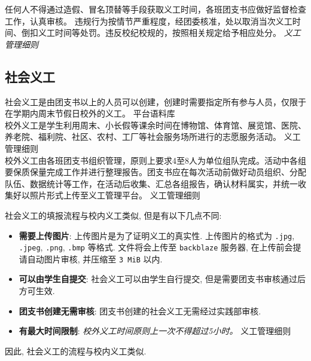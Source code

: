 \documentclass{article}
\begin{document}
\begin{mdframed}
  \fangsong
  任何人不得通过造假、冒名顶替等手段获取义工时间，各班团支书应做好监督检查工作，认真审核。
  违规行为按情节严重程度，经团委核准，处以取消当次义工时间、倒扣义工时间等处罚。违反校纪校规的，按照相关规定给予相应处分。
  \hfill \textit{义工管理细则}
\end{mdframed}

\subsection{社会义工}

\begin{mdframed}
  \fangsong
  社会义工是由团支书以上的人员可以创建，创建时需要指定所有参与人员，仅限于在学期内周末节假日校外的义工。 \hfill 平台语料库 \\
  校外义工是学生利用周末、小长假等课余时间在博物馆、体育馆、展览馆、医院、养老院、福利院、社区、农村、工厂等社会服务场所进行的志愿服务活动。 \hfill 义工管理细则 \\
  校外义工由各班团支书组织管理，原则上要求4至8人为单位组队完成。活动中各组要保质保量完成工作并进行整理报告。团支书应在每次活动前做好动员组织、分配队伍、数据统计等工作，在活动后收集、汇总各组报告，确认材料属实，并统一收集好以照片形式上传至义工管理平台。 \hfill 义工管理细则
\end{mdframed}

社会义工的填报流程与校内义工类似, 但是有以下几点不同:

\begin{itemize}
  \item \textbf{需要上传图片}: 上传图片是为了证明义工的真实性. 上传图片的格式为 \texttt{.jpg}, \texttt{.jpeg}, \texttt{.png}, \texttt{.bmp} 等格式. 文件将会上传至 \texttt{backblaze} 服务器, 在上传前会提请自动图片审核, 并压缩至 \texttt{3 MiB} 以内.
  \item \textbf{可以由学生自提交}: 社会义工可以由学生自行提交, 但是需要团支书审核通过后方可生效.
  \item \textbf{团支书创建无需审核}: 团支书创建的社会义工无需经过实践部审核.
  \item \textbf{有最大时间限制}: \textit{校外义工时间原则上一次不得超过5小时。} \hfill 义工管理细则
\end{itemize}

因此, 社会义工的流程与校内义工类似.
\end{document}
